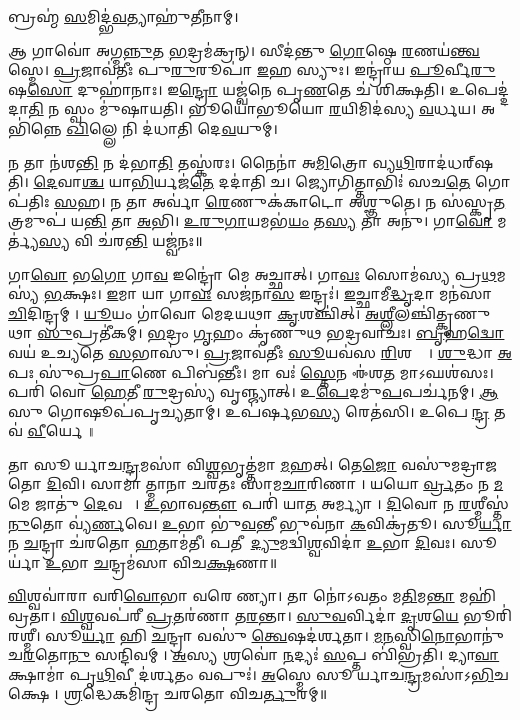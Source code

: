 𑌬𑍍𑌰𑌹𑍍𑌮॑ \ul{𑌸}𑌮𑌿𑌦𑍍𑌭॑\ul{𑌵}𑌤𑍍𑌯𑌾𑌹𑍁॑𑌤𑍀𑌨𑌾𑌮𑍍।

𑌆 𑌗𑌾𑌵𑍋॑ 𑌅𑌗𑍍𑌮\ul{𑌨𑍍𑌨𑍁}𑌤 \ul{𑌭}𑌦𑍍𑌰𑌮॑𑌕𑍍𑌰𑌨𑍍।
𑌸𑍀𑌦॑𑌨𑍍𑌤𑍁 \ul{𑌗𑍋}𑌷𑍍𑌠𑍇 \ul{𑌰}𑌣𑌯॑\ul{𑌨𑍍𑌤𑍍𑌵}𑌸𑍍𑌮𑍇।
\ul{𑌪𑍍𑌰}𑌜𑌾𑌵॑𑌤𑍀𑌃 𑌪𑍁\ul{𑌰𑍁}𑌰𑍂𑌪𑌾॑ \ul{𑌇}𑌹 𑌸𑍍𑌯𑍁𑌃।
𑌇𑌨𑍍𑌦𑍍𑌰𑌾॑𑌯 \ul{𑌪𑍂}𑌰𑍍𑌵𑍀\ul{𑌰𑍁}𑌷\ul{𑌸𑍋} 𑌦𑍁𑌹𑌾॑𑌨𑌾𑌃।
𑌇\ul{𑌨𑍍𑌦𑍍𑌰𑍋} 𑌯𑌜𑍍𑌵॑𑌨𑍇 𑌪𑍃\ul{𑌣}𑌤𑍇 𑌚॑ 𑌶𑌿𑌕𑍍𑌷𑌤𑌿।
𑌉𑌪𑍇𑌦𑍍𑌦॑𑌦𑌾\ul{𑌤𑌿} 𑌨 𑌸𑍍𑌵𑌂 𑌮𑍁॑𑌷𑌾𑌯𑌤𑌿।
𑌭𑍂𑌯𑍋॑𑌭𑍂𑌯𑍋 \ul{𑌰}𑌯𑌿𑌮𑌿𑌦॑𑌸𑍍𑌯 \ul{𑌵}𑌰𑍍𑌧𑌯\sn{}।
𑌅𑌭𑌿॑𑌨𑍍𑌨𑍇 \ul{𑌖𑌿}𑌲𑍍𑌲𑍇 𑌨𑌿 𑌦॑𑌧𑌾𑌤𑌿 𑌦𑍇\ul{𑌵}𑌯𑍁𑌮𑍍।

𑌨 𑌤𑌾 𑌨॑𑌶\ul{𑌨𑍍𑌤𑌿} 𑌨 𑌦॑𑌭𑌾\ul{𑌤𑌿} 𑌤𑌸𑍍𑌕॑𑌰𑌃।
𑌨𑍈𑌨𑌾॑ 𑌅\ul{𑌮𑌿}𑌤𑍍𑌰𑍋 𑌵𑍍𑌯\ul{𑌥𑌿}𑌰𑌾𑌦॑𑌧𑌰𑍍‌𑌷𑌤𑌿।
\ul{𑌦𑍇}𑌵𑌾\ul{𑌶𑍍𑌚} 𑌯𑌾\ul{𑌭𑌿}𑌰𑍍𑌯𑌜॑\ul{𑌤𑍇} 𑌦𑌦𑌾॑𑌤𑌿 𑌚।
𑌜𑍍𑌯𑍋𑌗𑌿𑌤𑍍𑌤𑌾𑌭𑌿𑌃॑ 𑌸𑌚\ul{𑌤𑍇} 𑌗𑍋𑌪॑𑌤𑌿𑌃 \ul{𑌸}𑌹।
𑌨 𑌤𑌾 𑌅𑌰𑍍𑌵𑌾॑ \ul{𑌰𑍇}𑌣𑍁𑌕॑𑌕𑌾𑌟𑍋 𑌅𑌶𑍍𑌞𑍁𑌤𑍇।
𑌨 𑌸॑𑌸𑍍𑌕𑍃\ul{𑌤}𑌤𑍍𑌰𑌮𑍁𑌪॑ 𑌯\ul{𑌨𑍍𑌤𑌿} 𑌤𑌾 \ul{𑌅}𑌭𑌿।
\ul{𑌉}\ul{𑌰𑍁}\ul{𑌗𑌾}𑌯𑌮𑌭॑\ul{𑌯𑌂} 𑌤\ul{𑌸𑍍𑌯} 𑌤𑌾 𑌅𑌨𑍁॑।
𑌗𑌾\ul{𑌵𑍋} 𑌮𑌰𑍍𑌤𑍍𑌯॑\ul{𑌸𑍍𑌯} 𑌵𑌿 𑌚॑𑌰\ul{𑌨𑍍𑌤𑌿} 𑌯𑌜𑍍𑌵॑𑌨𑌃॥

𑌗𑌾\ul{𑌵𑍋} 𑌭\ul{𑌗𑍋} 𑌗𑌾\ul{𑌵} 𑌇𑌨𑍍𑌦𑍍𑌰𑍋॑ 𑌮𑍇 𑌅𑌚𑍍𑌛𑌾𑌤𑍍।
𑌗𑌾\ul{𑌵𑌃} 𑌸𑍋𑌮॑𑌸𑍍𑌯 𑌪𑍍𑌰\ul{𑌥}𑌮𑌸𑍍𑌯॑ \ul{𑌭}𑌕𑍍𑌷𑌃।
\ul{𑌇}𑌮𑌾 𑌯𑌾 𑌗𑌾\ul{𑌵𑌃} 𑌸𑌜॑𑌨𑌾\ul{𑌸} 𑌇𑌨𑍍𑌦𑍍𑌰𑌃॑।
\ul{𑌇}𑌚𑍍𑌛𑌾𑌮𑍀\ul{𑌦𑍍𑌧𑍃}𑌦𑌾 𑌮𑌨॑𑌸𑌾 \ul{𑌚𑌿}𑌦𑌿𑌨𑍍𑌦𑍍𑌰𑌮𑍍।
\ul{𑌯𑍂}𑌯𑌂 𑌗𑌾॑𑌵𑍋 𑌮𑍇𑌦𑌯𑌥𑌾 \ul{𑌕𑍃}𑌶𑌞𑍍𑌚𑌿॑𑌤𑍍।
\ul{𑌅}\ul{𑌶𑍍𑌲𑍀}𑌲𑌞𑍍𑌚𑌿॑𑌤𑍍𑌕𑍃𑌣𑍁𑌥𑌾 \ul{𑌸𑍁}𑌪𑍍𑌰𑌤𑍀॑𑌕𑌮𑍍।
\ul{𑌭}𑌦𑍍𑌰𑌂 \ul{𑌗𑍃}𑌹𑌂 𑌕𑍃॑𑌣𑍁𑌥 𑌭𑌦𑍍𑌰𑌵𑌾𑌚𑌃।
\ul{𑌬𑍃}𑌹\ul{𑌦𑍍𑌵𑍋} 𑌵𑌯॑ 𑌉𑌚𑍍𑌯𑌤𑍇 \ul{𑌸}𑌭𑌾𑌸𑍁॑।
\ul{𑌪𑍍𑌰}𑌜𑌾𑌵॑𑌤𑍀𑌃 \ul{𑌸𑍂}𑌯𑌵॑𑌸 \ul{𑌰𑌿}𑌶𑌨𑍍𑌤𑍀𑌃᳚।
\ul{𑌶𑍁}𑌦𑍍𑌧𑌾 \ul{𑌅}𑌪𑌃 𑌸𑍁॑𑌪𑍍𑌰\ul{𑌪𑌾}𑌣𑍇 𑌪𑌿𑌬॑𑌨𑍍𑌤𑍀𑌃।
𑌮𑌾 𑌵𑌃॑ \ul{𑌸𑍍𑌤𑍇}𑌨 𑌈॑𑌶\ul{𑌤} 𑌮𑌾𑌽𑌘𑌶॑𑌸𑌃।
𑌪𑌰𑌿॑ 𑌵𑍋 \ul{𑌹𑍇}𑌤𑍀 \ul{𑌰𑍁}𑌦𑍍𑌰𑌸𑍍𑌯॑ 𑌵𑍃𑌞𑍍𑌜𑍍𑌯𑌾𑌤𑍍।
𑌉\ul{𑌪𑍇}𑌦𑌮𑍁॑\ul{𑌪}𑌪𑌰𑍍𑌚॑𑌨𑌮𑍍।
\ul{𑌆}𑌸𑍁 𑌗𑍋𑌷𑍂𑌪॑𑌪𑍃𑌚𑍍𑌯𑌤𑌾𑌮𑍍।
𑌉𑌪॑𑌰𑍍\mbox{}\ul{𑌷}𑌭\ul{𑌸𑍍𑌯} 𑌰𑍇𑌤॑𑌸𑌿।
𑌉𑌪𑍇\ul{𑌨𑍍𑌦𑍍𑌰} 𑌤𑌵॑ \ul{𑌵𑍀}𑌰𑍍𑌯𑍇॥

𑌤𑌾 𑌸𑍂𑌰𑍍𑌯𑌾𑌚\ul{𑌨𑍍𑌦𑍍𑌰}𑌮𑌸𑌾॑ 𑌵𑌿\ul{𑌶𑍍𑌵}𑌭𑍃𑌤𑍍𑌤॑𑌮𑌾 \ul{𑌮}𑌹𑌤𑍍।
𑌤𑍇\ul{𑌜𑍋} 𑌵𑌸𑍁॑𑌮𑌦𑍍𑌰𑌾𑌜𑌤𑍋 \ul{𑌦𑌿}𑌵𑌿।
𑌸𑌾𑌮𑌾𑌤𑍍𑌮𑌾𑌨𑌾 𑌚𑌰𑌤𑌃 𑌸𑌾𑌮\ul{𑌚𑌾}𑌰𑌿𑌣𑌾।
𑌯𑌯𑍋\ul{𑌰𑍍𑌵𑍍𑌰}𑌤𑌂 𑌨 \ul{𑌮}𑌮𑍇 𑌜𑌾𑌤𑍁॑ \ul{𑌦𑍇}𑌵𑌯𑍋𑌃᳚।
\ul{𑌉}𑌭𑌾𑌵\ul{𑌨𑍍𑌤𑍗} 𑌪𑌰𑌿॑ 𑌯𑌾\ul{𑌤} 𑌅𑌰𑍍𑌮𑍍𑌯𑌾।
\ul{𑌦𑌿}𑌵𑍋 𑌨 \ul{𑌰}𑌶𑍍𑌮𑍀𑌸𑍍𑌤॑\ul{𑌨𑍁}𑌤𑍋 𑌵𑍍𑌯॑\ul{𑌰𑍍𑌣}𑌵𑍇।
\ul{𑌉}𑌭𑌾 𑌭𑍁॑\ul{𑌵}𑌨𑍍𑌤𑍀 𑌭𑍁𑌵॑𑌨𑌾 \ul{𑌕}𑌵𑌿𑌕𑍍𑌰॑𑌤𑍂।
𑌸𑍂\ul{𑌰𑍍𑌯𑌾} 𑌨 \ul{𑌚}𑌨𑍍𑌦𑍍𑌰𑌾 𑌚॑𑌰𑌤𑍋 \ul{𑌹}𑌤𑌾𑌮॑𑌤𑍀।
𑌪𑌤𑍀 \ul{𑌦𑍍𑌯𑍁}𑌮𑌦𑍍𑌵𑌿॑\ul{𑌶𑍍𑌵}𑌵𑌿𑌦𑌾॑ \ul{𑌉}𑌭𑌾 \ul{𑌦𑌿}𑌵𑌃।
𑌸𑍂𑌰𑍍𑌯𑌾॑ \ul{𑌉}𑌭𑌾 \ul{𑌚}𑌨𑍍𑌦𑍍𑌰𑌮॑𑌸𑌾 𑌵𑌿𑌚\ul{𑌕𑍍𑌷}𑌣𑌾॥

\ul{𑌵𑌿}𑌶𑍍𑌵𑌵𑌾॑𑌰𑌾 𑌵𑌰𑌿\ul{𑌵𑍋}𑌭𑌾 𑌵𑌰𑍇𑌣𑍍𑌯𑌾।
𑌤𑌾 𑌨𑍋॑𑌽𑌵𑌤𑌂 𑌮\ul{𑌤𑌿}𑌮\ul{𑌨𑍍𑌤𑌾} 𑌮𑌹𑌿॑𑌵𑍍𑌰𑌤𑌾।
\ul{𑌵𑌿}\ul{𑌶𑍍𑌵}𑌵𑌪॑𑌰𑍀 \ul{𑌪𑍍𑌰}𑌤𑌰॑𑌣𑌾 𑌤\ul{𑌰}𑌨𑍍𑌤𑌾।
\ul{𑌸𑍁}\ul{𑌵}𑌰𑍍𑌵𑌿𑌦𑌾॑ \ul{𑌦𑍃}𑌶\ul{𑌯𑍇} 𑌭𑍂𑌰𑌿॑𑌰𑌶𑍍𑌮𑍀।
𑌸𑍂\ul{𑌰𑍍𑌯𑌾} 𑌹𑌿 \ul{𑌚}𑌨𑍍𑌦𑍍𑌰𑌾 𑌵𑌸𑍁॑ \ul{𑌤𑍍𑌵𑍇}𑌷𑌦॑𑌰𑍍\mbox{}𑌶𑌤𑌾।
\ul{𑌮}\ul{𑌨}𑌸𑍍𑌵𑌿\ul{𑌨𑍋}𑌭𑌾𑌨𑍁॑𑌚\ul{𑌰}𑌤𑍋\ul{𑌨𑍁} 𑌸𑌨𑍍𑌦𑌿𑌵𑌮𑍍।
\ul{𑌅}𑌸𑍍𑌯 𑌶𑍍𑌰𑌵𑍋॑ \ul{𑌨}𑌦𑍍𑌯𑌃॑ \ul{𑌸}𑌪𑍍𑌤 𑌬𑌿॑𑌭𑍍𑌰𑌤𑌿।
𑌦𑍍𑌯𑌾\ul{𑌵𑌾} 𑌕𑍍𑌷𑌾𑌮𑌾॑ 𑌪𑍃\ul{𑌥𑌿}𑌵𑍀 𑌦॑𑌰𑍍\mbox{}\ul{𑌶}𑌤𑌂 𑌵𑌪𑍁𑌃॑।
\ul{𑌅}𑌸𑍍𑌮𑍇 𑌸𑍂𑌰𑍍𑌯𑌾𑌚\ul{𑌨𑍍𑌦𑍍𑌰}𑌮𑌸𑌾॑𑌽\ul{𑌭𑌿}𑌚𑌕𑍍𑌷𑍇।
\ul{𑌶𑍍𑌰}𑌦𑍍𑌧𑍇𑌕𑌮𑌿॑𑌨𑍍𑌦𑍍𑌰 𑌚𑌰𑌤𑍋 𑌵𑌿𑌚\ul{𑌰𑍍𑌤𑍁}𑌰𑌮𑍍॥

